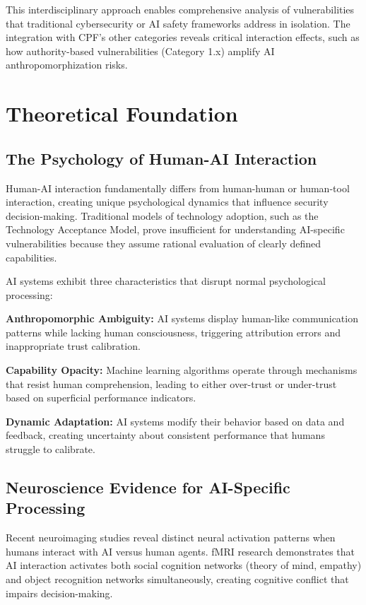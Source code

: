 \documentclass[11pt,a4paper]{article}
\begin{document}
This interdisciplinary approach enables comprehensive analysis of vulnerabilities that traditional cybersecurity or AI safety frameworks address in isolation. The integration with CPF's other categories reveals critical interaction effects, such as how authority-based vulnerabilities (Category 1.x) amplify AI anthropomorphization risks.

\section{Theoretical Foundation}

\subsection{The Psychology of Human-AI Interaction}

Human-AI interaction fundamentally differs from human-human or human-tool interaction, creating unique psychological dynamics that influence security decision-making. Traditional models of technology adoption, such as the Technology Acceptance Model\cite{davis1989}, prove insufficient for understanding AI-specific vulnerabilities because they assume rational evaluation of clearly defined capabilities.

AI systems exhibit three characteristics that disrupt normal psychological processing:

\textbf{Anthropomorphic Ambiguity:} AI systems display human-like communication patterns while lacking human consciousness, triggering attribution errors and inappropriate trust calibration\cite{reeves1996}.

\textbf{Capability Opacity:} Machine learning algorithms operate through mechanisms that resist human comprehension, leading to either over-trust or under-trust based on superficial performance indicators\cite{ribeiro2016}.

\textbf{Dynamic Adaptation:} AI systems modify their behavior based on data and feedback, creating uncertainty about consistent performance that humans struggle to calibrate\cite{zhang2020}.

\subsection{Neuroscience Evidence for AI-Specific Processing}

Recent neuroimaging studies reveal distinct neural activation patterns when humans interact with AI versus human agents. fMRI research demonstrates that AI interaction activates both social cognition networks (theory of mind, empathy) and object recognition networks simultaneously, creating cognitive conflict that impairs decision-making\cite{carter2023}.
\end{document}
